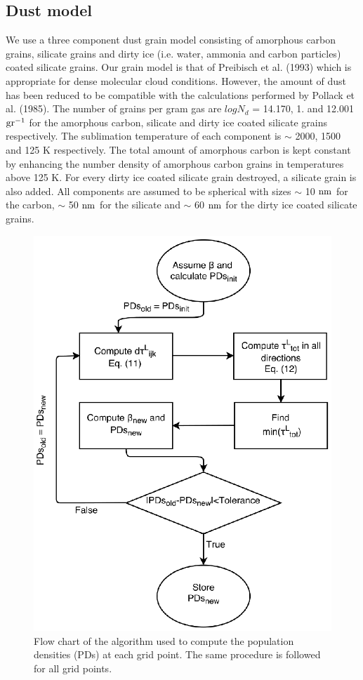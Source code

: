\documentclass{mn2e}
\begin{document}
\subsection{Dust model}\label{dust}

We use a three component dust grain model consisting of amorphous carbon grains, silicate grains and dirty ice (i.e. water, ammonia and carbon particles) coated silicate grains. Our grain model is that of Preibisch et al. (1993) which is appropriate for dense molecular cloud conditions. However, the amount of dust has been reduced to be compatible with the calculations performed by Pollack et al. (1985). The number of grains per gram gas are $logN_d$ = 14.170, 1. and 12.001 $\rm{gr^{-1}}$ for the amorphous carbon, silicate and dirty ice coated silicate grains respectively. The sublimation temperature of each component is $\sim$ 2000, 1500 and 125 K respectively. The total amount of amorphous carbon is kept constant by enhancing the number density of amorphous carbon grains in temperatures above 125 K. For every dirty ice coated silicate grain destroyed, a silicate grain is also added. All components are assumed to be spherical with sizes $\sim$ 10 $\rm{nm}$ for the carbon, $\sim$ 50 $\rm{nm}$ for the silicate and $\sim$ 60 $\rm{nm}$ for the dirty ice coated silicate grains. 
\begin{figure}
\includegraphics[width=1.0\columnwidth, clip]{algorithm2.eps}
\caption{Flow chart of the algorithm used to compute the population densities (PDs) at each grid point. The same procedure is followed for all grid points.
\label{algorithm}}
\end{figure}
\end{document}
